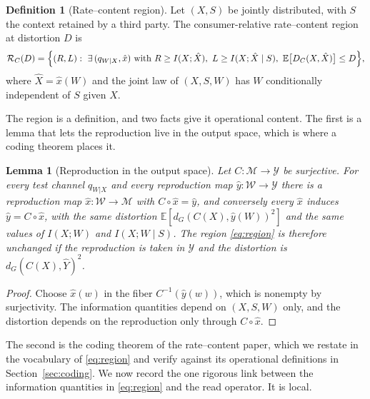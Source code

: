 \documentclass[11pt]{article}
\newtheorem{lemma}{Lemma}
\theoremstyle{definition}
\newtheorem{definition}{Definition}
\theoremstyle{remark}
\newcommand{\M}{\mathcal{M}}
\newcommand{\Y}{\mathcal{Y}}
\newcommand{\E}{\mathbb{E}}
\newcommand{\dG}{d_{G}}
\begin{document}
\begin{definition}[Rate--content region]
\label{def:region}
Let $(X,S)$ be jointly distributed, with $S$ the context retained by a third party. The consumer-relative rate--content region at distortion $D$ is
\begin{equation}
\mathcal{R}_{C}(D)=\Bigl\{(R,L):\ \exists\,(q_{W|X},\hat{x})\ \text{with}\ R\ge I(X;\hat{X}),\ L\ge I(X;\hat{X}\mid S),\ \E\bigl[D_{C}(X,\hat{X})\bigr]\le D\Bigr\},
\label{eq:region}
\end{equation}
where $\hat{X}=\hat{x}(W)$ and the joint law of $(X,S,W)$ has $W$ conditionally independent of $S$ given $X$.
\end{definition}

The region is a definition, and two facts give it operational content.
The first is a lemma that lets the reproduction live in the output space, which is where a coding theorem places it.

\begin{lemma}[Reproduction in the output space]
\label{lem:outputrep}
Let $C:\M\to\Y$ be surjective. For every test channel $q_{W|X}$ and every reproduction map $\hat{y}:\mathcal{W}\to\Y$ there is a reproduction map $\hat{x}:\mathcal{W}\to\M$ with $C\circ\hat{x}=\hat{y}$, and conversely every $\hat{x}$ induces $\hat{y}=C\circ\hat{x}$, with the same distortion $\E[\dG(C(X),\hat{y}(W))^{2}]$ and the same values of $I(X;W)$ and $I(X;W\mid S)$. The region \eqref{eq:region} is therefore unchanged if the reproduction is taken in $\Y$ and the distortion is $\dG(C(X),\hat{Y})^{2}$.
\end{lemma}

\begin{proof}
Choose $\hat{x}(w)$ in the fiber $C^{-1}(\hat{y}(w))$, which is nonempty by surjectivity. The information quantities depend on $(X,S,W)$ only, and the distortion depends on the reproduction only through $C\circ\hat{x}$.
\end{proof}

The second is the coding theorem of the rate--content paper, which we restate in the vocabulary of \eqref{eq:region} and verify against its operational definitions in Section~\ref{sec:coding}.
We now record the one rigorous link between the information quantities in \eqref{eq:region} and the read operator.
It is local.
\end{document}
